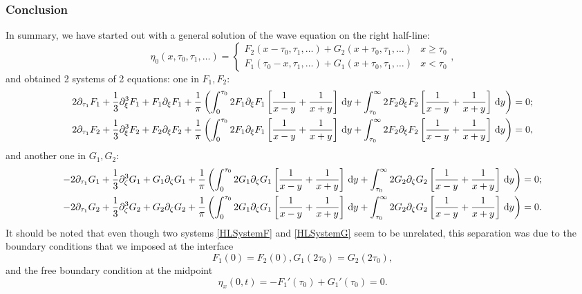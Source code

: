 \documentclass[10pt,reqno,oneside,a4paper, landscape]{article}
\begin{document}
\subsubsection{Conclusion}
In summary, we have started out with a general solution of the wave equation on the right half-line:
\[ \eta_0(x, \tau_0, \tau_1, \ldots ) = \begin{cases} F_2(x-\tau_0, \tau_1, \ldots ) + G_2(x+\tau_0, \tau_1, \ldots) & x\geq \tau_0 \\ F_1(\tau_0-x, \tau_1, \ldots ) + G_1(x+\tau_0, \tau_1, \ldots) & x<\tau_0 \end{cases}, \]
and obtained 2 systems of 2 equations: one in $F_1, F_2:$
\begin{equation}\label{HLSystemF}
\begin{aligned}
2 \partial_{\tau_1}F_1 + \frac{1}{3} \partial_\xi^3 F_1 + F_1\partial_\xi F_1 + \frac{1}{\pi} \left( \int_0^{\tau_0} 2 F_1  \partial_\xi F_1 \left[ \frac{1}{x-y} + \frac{1}{x+y} \right] \,\mathrm{d} y +\int_{\tau_0}^\infty 2 F_2 \partial_\xi F_2\left[ \frac{1}{x-y} + \frac{1}{x+y} \right] \,\mathrm{d} y \right) &= 0; \\
2 \partial_{\tau_1}F_2 + \frac{1}{3} \partial_\xi^3 F_2 + F_2\partial_\xi F_2 + \frac{1}{\pi} \left( \int_0^{\tau_0} 2 F_1  \partial_\xi F_1 \left[ \frac{1}{x-y} + \frac{1}{x+y} \right] \,\mathrm{d} y +\int_{\tau_0}^\infty 2 F_2 \partial_\xi F_2\left[ \frac{1}{x-y} + \frac{1}{x+y} \right] \,\mathrm{d} y \right) &= 0,
\end{aligned}
\end{equation}
and another one in $G_1, G_2:$
\begin{equation}\label{HLSystemG}
\begin{aligned}
- 2 \partial_{\tau_1} G_1 +  \frac{1}{3} \partial_\zeta^3 G_1+ G_1 \partial_{\zeta} G_1  + \frac{1}{\pi} \left( \int_0^{\tau_0}  2 G_1 \partial_\zeta G_1 \left[ \frac{1}{x-y} + \frac{1}{x+y} \right] \,\mathrm{d} y +\int_{\tau_0}^\infty 2 G_2 \partial_\zeta G_2 \left[ \frac{1}{x-y} + \frac{1}{x+y} \right] \,\mathrm{d} y \right) &= 0; \\
- 2 \partial_{\tau_1} G_2 +  \frac{1}{3} \partial_\zeta^3 G_2+ G_2 \partial_{\zeta} G_2  + \frac{1}{\pi} \left( \int_0^{\tau_0}  2 G_1 \partial_\zeta G_1 \left[ \frac{1}{x-y} + \frac{1}{x+y} \right] \,\mathrm{d} y +\int_{\tau_0}^\infty 2 G_2 \partial_\zeta G_2 \left[ \frac{1}{x-y} + \frac{1}{x+y} \right] \,\mathrm{d} y \right) &= 0.
\end{aligned}
\end{equation}
It should be noted that even though two systems \eqref{HLSystemF} and \eqref{HLSystemG} seem to be unrelated, this separation was due to the boundary conditions that we imposed at the interface
\[ F_1(0) = F_2(0), G_1(2\tau_0) =G_2(2\tau_0), \]
and the free boundary condition at the midpoint
\[ \eta_x(0,t) = -F_1'(\tau_0)+ G_1'(\tau_0) = 0. \]
\end{document}
